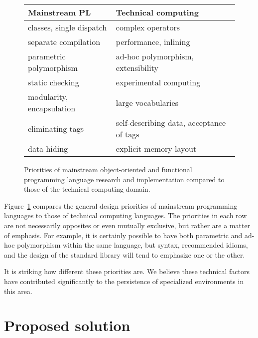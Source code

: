 \begin{figure}
  \label{PLpriorities}
  \begin{center}
    \begin{tabular}{|l|l|}\hline
      \textbf{Mainstream PL} & \textbf{Technical computing} \\
      \hline \hline
      classes, single dispatch             &  complex operators \\
      \hline
      separate compilation                 &  performance, inlining \\
      \hline
      parametric polymorphism              &  ad-hoc polymorphism, extensibility \\
      \hline
      static checking                      &  experimental computing \\
      \hline
      modularity, encapsulation            &  large vocabularies \\
      \hline
      eliminating tags                     &  self-describing data, acceptance of tags \\
      \hline
      data hiding                          &  explicit memory layout \\
      \hline
    \end{tabular}
  \end{center}
  \caption{
    Priorities of mainstream object-oriented and functional programming language research and
    implementation compared to those of the technical computing domain.
  }
\end{figure}

Figure~\ref{PLpriorities} compares the general design priorities of mainstream programming
languages to those of technical computing languages. The priorities in each row are not
necessarily opposites or even mutually exclusive, but rather are a matter of emphasis.
For example, it is certainly possible to have both parametric and ad-hoc polymorphism within
the same language, but syntax, recommended idioms, and the design of the standard library will
tend to emphasize one or the other.

It is striking how different these priorities are. We believe these technical factors have
contributed significantly to the persistence of specialized environments in this area.


\section{Proposed solution}

